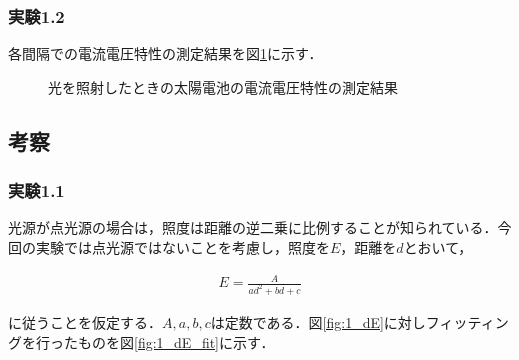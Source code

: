 \documentclass[1_power_supply.tex]{subfiles}
\begin{document}
\subsubsection{実験1.2}

各間隔での電流電圧特性の測定結果を図\ref{fig:1_VI}に示す．

\begin{figure}[htbp]
	\begin{center}
		\caption{光を照射したときの太陽電池の電流電圧特性の測定結果}\label{fig:1_VI}
	\end{center}
\end{figure}

\subsection{考察}

\subsubsection{実験1.1}

光源が点光源の場合は，照度は距離の逆二乗に比例することが知られている．今回の実験では点光源ではないことを考慮し，照度を$E$，距離を$d$とおいて，

\begin{align}
	E = \frac{A}{ad^2+bd+c}
\end{align}

に従うことを仮定する．$A,a,b,c$は定数である．図\ref{fig:1_dE}に対しフィッティングを行ったものを図\ref{fig:1_dE_fit}に示す．
\end{document}
